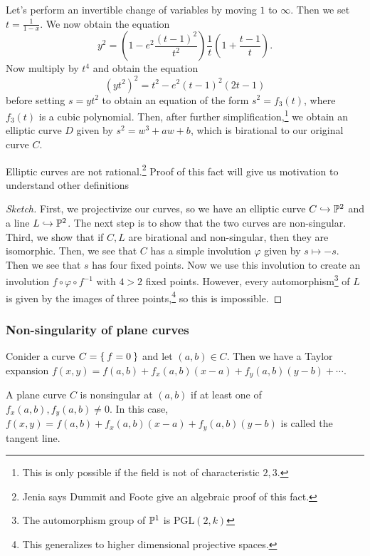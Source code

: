 \documentclass[twoside, 10pt]{article}
\begin{document}
    Let's perform an invertible change of variables by moving $1$ to $\infty$.
    Then we set $t = \frac{1}{1-x}$. We now obtain the equation \[y^2 = \left(
        1-e^2 \frac{(t-1)^2}{t^2} \right) \frac{1}{t} \left( 1+ \frac{t-1}{t}
    \right).\] Now multiply by $t^4$ and obtain the equation \[ (yt^2)^2 =
t^2-e^2(t-1)^2(2t-1) \] before setting $s=yt^2$ to obtain an equation of the
form $s^2 = f_3(t)$, where $f_3(t)$ is a cubic polynomial. Then, after further
simplification,\footnote{This is only possible if the field is not of
characteristic $2,3$.} we obtain an elliptic curve $D$ given by $s^2 = w^3 +
aw+b$, which is birational to our original curve $C$.

    \begin{thm} Elliptic curves are not rational.\footnote{Jenia says Dummit
        and Foote give an algebraic proof of this fact.} Proof of this fact
        will give us motivation to understand other definitions
        \begin{proof}[Sketch] First, we projectivize our curves, so we have an
            elliptic curve $C \hookrightarrow \P^2$ and a line $L
            \hookrightarrow \P^2$. The next step is to show that the two curves
            are non-singular. Third, we show that if $C,L$ are birational and
            non-singular, then they are isomorphic. Then, we see that $C$ has a
            simple involution $\varphi$ given by $s \mapsto -s$. Then we see
            that $s$ has four fixed points. Now we use this involution to
            create an involution $f \circ \varphi \circ f^{-1}$ with $4 > 2$
            fixed points. However, every automorphism\footnote{The automorphism
                group of $\P^1$ is $\mathrm{PGL}(2,k)$} of $L$ is given by the
            images of three points,\footnote{This generalizes to higher
        dimensional projective spaces.} so this is impossible.  \end{proof}
    \end{thm}

    \subsubsection{Non-singularity of plane curves} Conider a curve $C =
    \Set{f=0}$ and let $(a,b) \in C$. Then we have a Taylor expansion $f(x,y) =
    f(a,b) + f_x(a,b)(x-a) + f_y(a,b)(y-b) + \cdots$.
   
    \begin{defn} A plane curve $C$ is nonsingular at $(a,b)$
    if at least one of $f_x(a,b), f_y(a,b) \neq 0$. In this case, $f(x,y) =
f(a,b) + f_x(a,b)(x-a) + f_y(a,b)(y-b)$ is called the tangent line.  \end{defn}
\end{document}
